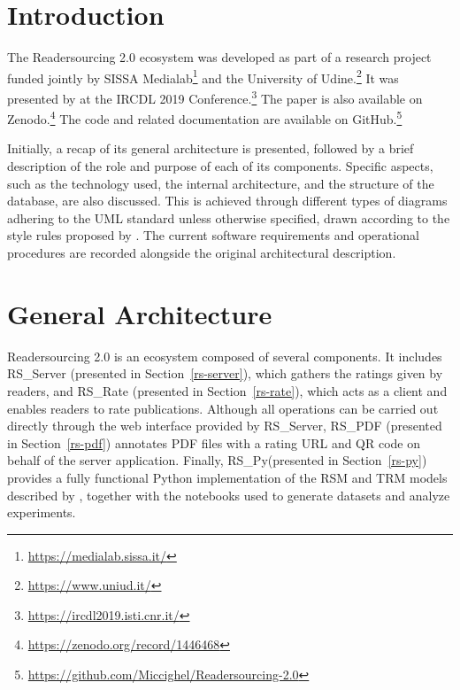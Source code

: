 \documentclass[a4paper, english]{article}
\newcommand{\rsserver}{RS\_Server\xspace}
\newcommand{\rspdf}{RS\_PDF\xspace}
\newcommand{\rsrate}{RS\_Rate\xspace}
\newcommand{\rspy}{RS\_Py\xspace}
\begin{document}
\hypersetup{pageanchor=false}
\maketitle
\hypersetup{pageanchor=true}
\setcounter{page}{1}

\tableofcontents

\newpage

\listoffigures

\newpage

\listoftables

\newpage
{}


\section{Introduction}


The Readersourcing 2.0 ecosystem was developed as part of a research project funded jointly by SISSA Medialab\footnote{\url{https://medialab.sissa.it/}} and the University of Udine.\footnote{\url{https://www.uniud.it/}} It was presented by \citet{Soprano2019} at the IRCDL 2019 Conference.\footnote{\url{https://ircdl2019.isti.cnr.it/}} The paper is also available on Zenodo.\footnote{\url{https://zenodo.org/record/1446468}} The code and related documentation are available on GitHub.\footnote{\url{https://github.com/Miccighel/Readersourcing-2.0}}

Initially, a recap of its general architecture is presented, followed by a brief description of the role and purpose of each of its components. Specific aspects, such as the technology used, the internal architecture, and the structure of the database, are also discussed. This is achieved through different types of diagrams adhering to the UML standard unless otherwise specified, drawn according to the style rules proposed by \citet{Fowler03}. The current software requirements and operational procedures are recorded alongside the original architectural description.

\section{General Architecture}

Readersourcing 2.0 is an ecosystem composed of several components. It includes \rsserver \cite{RS-Server} (presented in Section~\ref{rs-server}), which gathers the ratings given by readers, and \rsrate \cite{RS-Rate} (presented in Section~\ref{rs-rate}), which acts as a client and enables readers to rate publications. Although all operations can be carried out directly through the web interface provided by \rsserver, \rspdf \cite{RS-PDF} (presented in Section~\ref{rs-pdf}) annotates PDF files with a rating URL and QR code on behalf of the server application. Finally, \rspy (presented in Section~\ref{rs-py}) provides a fully functional Python implementation of the RSM and TRM models described by \citet{Soprano2019}, together with the notebooks used to generate datasets and analyze experiments.
\end{document}

